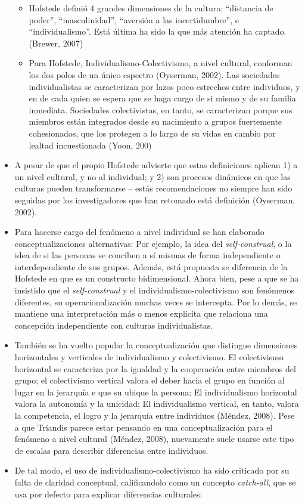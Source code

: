\documentclass[12pt,twoside]{templates/facsothesis}
\providecommand{\tightlist}{%
  \setlength{\itemsep}{0pt}\setlength{\parskip}{0pt}}
\begin{document}
\begin{itemize}
  \begin{itemize}
  \tightlist
  \item
    Hofstede definió 4 grandes dimensiones de la cultura: ``distancia de poder'', ``masculinidad'', ``aversión a las incertidumbre'', e ``individualismo''. Está última ha sido la que más atención ha captado. (Brewer, 2007)
  \item
    Para Hofstede, Individualismo-Colectivismo, a nivel cultural, conforman los dos polos de un único espectro (Oyserman, 2002). Las sociedades individualistas se caracterizan por lazos poco estrechos entre individuos, y en de cada quien se espera que se haga cargo de si mismo y de su familia inmediata. Sociedades colectivistas, en tanto, se caracterizan porque sus miembros están integrados desde su nacimiento a grupos fuertemente cohesionados, que los protegen a lo largo de su vidas en cambio por lealtad incuestionada (Yoon, 200)
  \end{itemize}
\item
  A pesar de que el propio Hofstede advierte que estas definiciones aplican 1) a un nivel cultural, y no al individual; y 2) son procesos dinámicos en que las culturas pueden transformarse -- estás recomendaciones no siempre han sido seguidas por los investigadores que han retomado está definición (Oyserman, 2002).
\item
  Para hacerse cargo del fenómeno a nivel individual se han elaborado conceptualizaciones alternativas: Por ejemplo, la idea del \emph{self-construal}, o la idea de si las personas se conciben a sí mismas de forma independiente o interdependiente de sus grupos. Además, está propuesta se diferencia de la Hofstede en que es un constructo bidimensional. Ahora bien, pese a que se ha insistido que el \emph{self-construal} y el individualismo-colectivismo son fenómenos diferentes, su operacionalización muchas veces se intercepta. Por lo demás, se mantiene una interpretación más o menos explícita que relaciona una concepción independiente con culturas individualistas.
\item
  También se ha vuelto popular la conceptualización que distingue dimensiones horizontales y verticales de individualismo y colectivismo. El colectivismo horizontal se caracteriza por la igualdad y la cooperación entre miembros del grupo; el colectivismo vertical valora el deber hacia el grupo en función al lugar en la jerarquía e que su ubique la persona; El individualismo horizontal valora la autonomía y la unicidad; El individualismo vertical, en tanto, valora la competencia, el logro y la jerarquía entre individuos (Méndez, 2008). Pese a que Triandis parece estar pensando en una conceptualización para el fenómeno a nivel cultural (Méndez, 2008), nuevamente suele usarse este tipo de escalas para describir diferencias entre individuos.
\item
  De tal modo, el uso de individualismo-colectivismo ha sido criticado por su falta de claridad conceptual, calificandolo como un concepto \emph{catch-all}, que se usa por defecto para explicar diferencias culturales:


\end{itemize}
\end{document}
